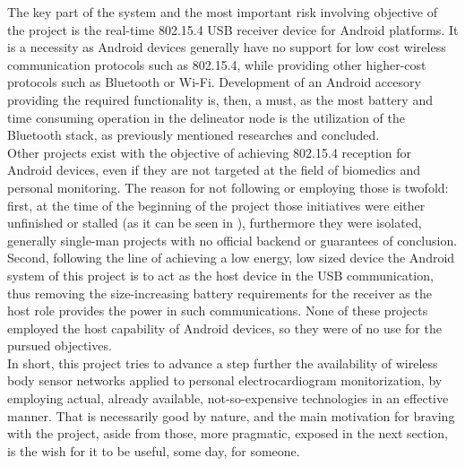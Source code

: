 		The key part of the system and the most important risk involving objective of the project is the real-time 802.15.4 USB receiver device for Android platforms. It is a necessity as Android devices generally have no support for low cost wireless communication protocols such as 802.15.4, while providing other higher-cost protocols such as Bluetooth or Wi-Fi. Development of an Android accesory providing the required functionality is, then, a must, as the most battery and time consuming operation in the delineator node is the utilization of the Bluetooth stack, as previously mentioned researches \cite{ESL} and \cite{ecg.del.paper} concluded.\\

		Other projects exist with the objective of achieving 802.15.4 reception for Android devices, even if they are not targeted at the field of biomedics and personal monitoring. The reason for not following or employing those is twofold: 
		first, at the time of the beginning of the project those initiatives were either unfinished or stalled (as it can be seen in \cite{and-zigbee}), furthermore they were isolated, generally single-man projects with no official backend or guarantees of conclusion.
		Second, following the line of achieving a low energy, low sized device the Android system of this project is to act as the host device in the USB communication, thus removing the size-increasing battery requirements for the receiver as the host role provides the power in such communications. None of these projects employed the host capability of Android devices, so they were of no use for the pursued objectives.\\

		In short, this project tries to advance a step further the availability of wireless body sensor networks applied to personal electrocardiogram monitorization, by employing actual, already available, not-so-expensive technologies in an effective manner. That is necessarily good by nature, and the main motivation for braving with the project, aside from those, more pragmatic, exposed in the next section, is the wish for it to be useful, some day, for someone.

